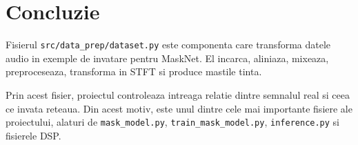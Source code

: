 \documentclass[12pt,a4paper]{report}
\begin{document}
\chapter{Concluzie}

Fisierul \texttt{src/data\_prep/dataset.py} este componenta care transforma datele audio in exemple de invatare pentru MaskNet. El incarca, aliniaza, mixeaza, preproceseaza, transforma in STFT si produce mastile tinta.

Prin acest fisier, proiectul controleaza intreaga relatie dintre semnalul real si ceea ce invata reteaua. Din acest motiv, este unul dintre cele mai importante fisiere ale proiectului, alaturi de \texttt{mask\_model.py}, \texttt{train\_mask\_model.py}, \texttt{inference.py} si fisierele DSP.
\end{document}
